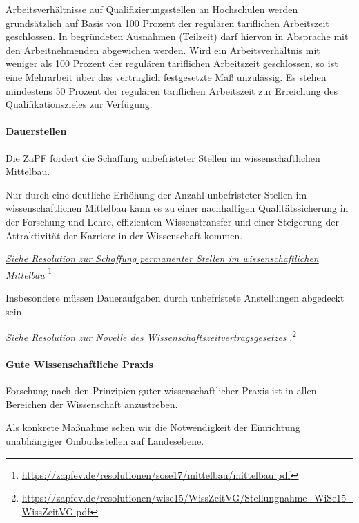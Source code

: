 \documentclass[DIV=calc]{scrartcl}
\begin{document}
Arbeitsverhältnisse auf Qualifizierungsstellen an Hochschulen werden grundsätzlich auf Basis von 100 Prozent der regulären tariflichen Arbeitszeit geschlossen. In begründeten Ausnahmen (Teilzeit) darf hiervon in Absprache mit den Arbeitnehmenden abgewichen werden. Wird ein Arbeitsverhältnis mit weniger als 100 Prozent der regulären tariflichen Arbeitszeit geschlossen, so ist eine Mehrarbeit über das vertraglich festgesetzte Maß unzulässig. Es stehen mindestens 50 Prozent der regulären tariflichen Arbeitszeit zur Erreichung des Qualifikationszieles zur Verfügung.

\hypertarget{dauerstellen}{%
\paragraph{Dauerstellen}\label{dauerstellen}}
Die ZaPF fordert die Schaffung unbefristeter Stellen im wissenschaftlichen Mittelbau.

Nur durch eine deutliche Erhöhung der Anzahl unbefristeter Stellen im wissenschaftlichen Mittelbau kann es zu einer nachhaltigen Qualitätssicherung in der Forschung und Lehre, effizientem Wissenstransfer und einer Steigerung der Attraktivität der Karriere in der Wissenschaft kommen.

\href{https://zapfev.de/resolutionen/sose17/mittelbau/mittelbau.pdf}{\emph{Siehe Resolution zur Schaffung permanenter
    Stellen im wissenschaftlichen Mittelbau
  }}\footnote{\url{https://zapfev.de/resolutionen/sose17/mittelbau/mittelbau.pdf}}

Insbesondere müssen Daueraufgaben durch unbefristete Anstellungen abgedeckt sein.

\href{https://zapfev.de/resolutionen/wise15/WissZeitVG/Stellungnahme_WiSe15_WissZeitVG.pdf}{\emph{Siehe Resolution zur Novelle des Wissenschaftszeitvertragsgesetzes
  }}.\footnote{\url{https://zapfev.de/resolutionen/wise15/WissZeitVG/Stellungnahme_WiSe15_WissZeitVG.pdf}}

\hypertarget{gute-wissenschaftliche-praxis}{%
\paragraph{Gute Wissenschaftliche Praxis}\label{gute-wissenschaftliche-praxis}}
Forschung nach den Prinzipien guter wissenschaftlicher Praxis ist in allen Bereichen der Wissenschaft anzustreben.

Als konkrete Maßnahme sehen wir die Notwendigkeit der Einrichtung unabhängiger Ombudsstellen auf Landesebene.
\end{document}
